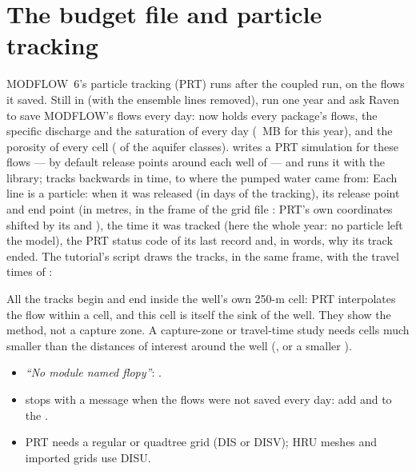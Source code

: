 \section{The budget file and particle tracking}
MODFLOW~6's particle tracking (PRT) runs after the coupled run, on the flows it saved. Still in 
(with the ensemble lines removed), run one year and ask Raven to save MODFLOW's flows every day:
 now holds every package's flows, the specific discharge and the saturation of every day
(~MB for this year), and  the porosity of every cell ( of the aquifer classes).
 writes a PRT simulation for these flows --- by default  release points around each well of
 --- and runs it with the library;  tracks backwards in time, to where the pumped water came
from:
Each line is a particle: when it was released (in days of the tracking), its release point and end point (in metres, in the
frame of the grid file : PRT's own coordinates shifted by its  and ), the time it was tracked (here the whole year: no particle left the model), the PRT status code of its
last record and, in words, why its track ended. The tutorial's script draws the tracks, in the same frame, with the travel times of :
\begin{note}
All the tracks begin and end inside the well's own 250-m cell: PRT interpolates the flow within a cell, and this cell is
itself the sink of the well. They show the method, not a capture zone. A capture-zone or travel-time study needs cells
much smaller than the distances of interest around the well (, or a smaller
).
\end{note}
\begin{trouble}
\begin{itemize}
\item \emph{``No module named flopy''}: .
\item {} stops with a message when the flows were not saved every day: add  and
       to the .
\item PRT needs a regular or quadtree grid (DIS or DISV); HRU meshes and imported grids use DISU.
\end{itemize}
\end{trouble}

